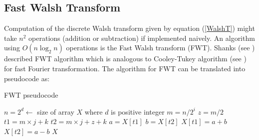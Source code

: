 \subsection{Fast Walsh Transform}
Computation of the discrete Walsh transform given by equation (\ref{WalshT}) might take $n^2$ operations 
(addition or subtraction) if implemented naively.
An algorithm using $O(n \log_2 n)$ operations is the Fast Walsh transform (FWT). 
Shanks (see \cite{Shanks1969}) described FWT algorithm which is analogous to 
Cooley-Tukey algorithm (see \cite{CooleyTukey1965}) for fast Fourier transformation.
The algorithm for FWT can be translated into pseudocode as:
\begin{algorithm}[ht]
\caption{FWT pseudocode}
\label{FWTpseudo}
\begin{algorithmic}[1]

\State $n = 2^d   \gets $  size of array $X$ where $d$ is positive integer
\State $m = n/2^i$
\State $z = m/2$
\State $t1 = m \times j + k$
\State $t2 = m \times j + z +k$
\State $a = X[t1]$
\State $b= X[t2]$
\State $X[t1] = a + b$
\State $X[t2] = a - b$
\EndFor
\EndFor
\EndFor
\State \Return $X$
\EndProcedure
\end{algorithmic}
\end{algorithm}

